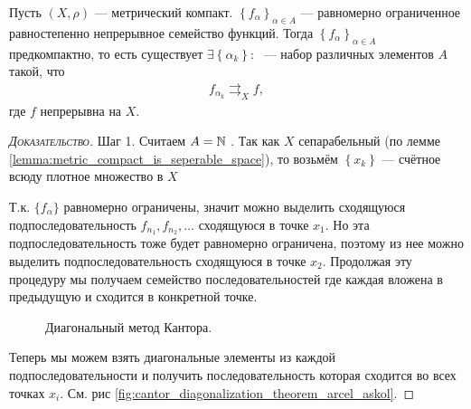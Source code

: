 \documentclass[../complex-analysis.tex]{subfiles}
\begin{document}
 \begin{thm}
  Пусть $ (X,\rho) $ --- метрический компакт.  $ \left\{f_\alpha\right\}_{\alpha \in A}  $ --- равномерно ограниченное равностепенно непрерывное семейство функций. Тогда $ \left\{f_\alpha\right\}_{\alpha \in A} $ предкомпактно, то есть существует $ \exists \left\{\alpha_k\right\} \colon\;  $ --- набор различных элементов $ A $ такой, что
  \begin{align*}
   f_{\alpha_k} \rightrightarrows_X f,
  \end{align*} где $ f $ непрерывна на $ X $.
 \end{thm}
 \begin{proof}[\normalfont\textsc{Доказательство}]
	 Шаг 1. Считаем $ A = \mathbb{N} $ . Так как $ X $  сепарабельный (по лемме \ref{lemma:metric_compact_is_seperable_space}), то возьмём $ \left\{x_k\right\}  $ --- счётное всюду плотное множество в $X$

  Т.к. $\{ f_\alpha \}$ равномерно ограничены, значит можно выделить сходящуюся подпоследовательность $f_{n_1}, f_{n_2}, \ldots $ сходящуюся в точке $x_1$.
  Но эта подпоследовательность тоже будет равномерно ограничена, поэтому из нее можно выделить подпоследовательность сходящуюся в точке $x_2$.
  Продолжая эту процедуру мы получаем семейство последовательностей где каждая вложена в предыдущую и сходится в конкретной точке.
  
\begin{figure}[ht]
    \centering
    \caption{Диагональный метод Кантора.}
    \label{fig:cantor_diagonalization_theorem_arcel_askol}
\end{figure}

  Теперь мы можем взять диагональные элементы из каждой подпоследовательности и получить последовательность которая сходится во всех точках $x_i$.
  См. рис \eqref{fig:cantor_diagonalization_theorem_arcel_askol}. 
\end{proof}
\end{document}
